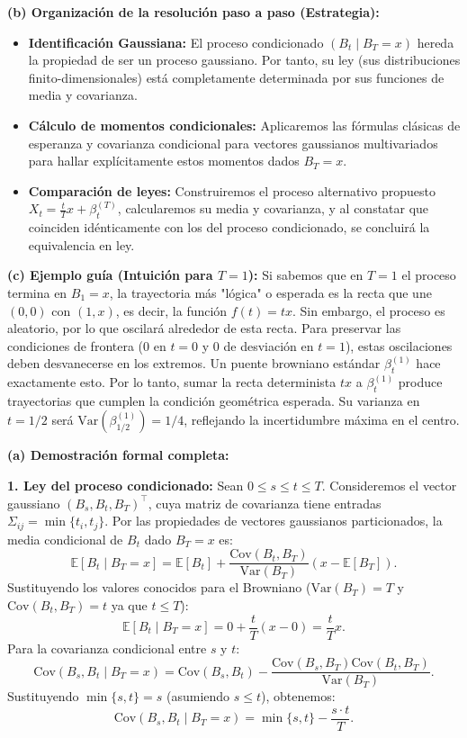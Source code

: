 \documentclass[11pt, letterpaper]{article}
\begin{document}
\begin{solucion}
    \textbf{(b) Organización de la resolución paso a paso (Estrategia):}
    \begin{itemize}
        \item[(i)] \textbf{Identificación Gaussiana:} El proceso condicionado $(B_t \mid B_T = x)$ hereda la propiedad de ser un proceso gaussiano. Por tanto, su ley (sus distribuciones finito-dimensionales) está completamente determinada por sus funciones de media y covarianza.
        \item[(ii)] \textbf{Cálculo de momentos condicionales:} Aplicaremos las fórmulas clásicas de esperanza y covarianza condicional para vectores gaussianos multivariados para hallar explícitamente estos momentos dados $B_T = x$.
        \item[(iii)] \textbf{Comparación de leyes:} Construiremos el proceso alternativo propuesto $X_t = \frac{t}{T}x + \beta_t^{(T)}$, calcularemos su media y covarianza, y al constatar que coinciden idénticamente con los del proceso condicionado, se concluirá la equivalencia en ley.
    \end{itemize}

    \vspace{3mm}
    \textbf{(c) Ejemplo guía (Intuición para $T=1$):}
    Si sabemos que en $T=1$ el proceso termina en $B_1 = x$, la trayectoria más "lógica" o esperada es la recta que une $(0,0)$ con $(1,x)$, es decir, la función $f(t) = tx$. 
    Sin embargo, el proceso es aleatorio, por lo que oscilará alrededor de esta recta. Para preservar las condiciones de frontera ($0$ en $t=0$ y $0$ de desviación en $t=1$), estas oscilaciones deben desvanecerse en los extremos. Un puente browniano estándar $\beta_t^{(1)}$ hace exactamente esto. Por lo tanto, sumar la recta determinista $tx$ a $\beta_t^{(1)}$ produce trayectorias que cumplen la condición geométrica esperada. Su varianza en $t=1/2$ será $\text{Var}(\beta_{1/2}^{(1)}) = 1/4$, reflejando la incertidumbre máxima en el centro.

    \vspace{3mm}
    \textbf{(a) Demostración formal completa:}
    
    \textbf{1. Ley del proceso condicionado:}
    Sean $0 \le s \le t \le T$. Consideremos el vector gaussiano $(B_s, B_t, B_T)^\top$, cuya matriz de covarianza tiene entradas $\Sigma_{ij} = \min\{t_i, t_j\}$.
    Por las propiedades de vectores gaussianos particionados, la media condicional de $B_t$ dado $B_T = x$ es:
    \[ \mathbb{E}[B_t \mid B_T = x] = \mathbb{E}[B_t] + \frac{\text{Cov}(B_t, B_T)}{\text{Var}(B_T)}(x - \mathbb{E}[B_T]). \]
    Sustituyendo los valores conocidos para el Browniano ($\text{Var}(B_T) = T$ y $\text{Cov}(B_t, B_T) = t$ ya que $t \le T$):
    \[ \mathbb{E}[B_t \mid B_T = x] = 0 + \frac{t}{T}(x - 0) = \frac{t}{T}x. \]
    Para la covarianza condicional entre $s$ y $t$:
    \[ \text{Cov}(B_s, B_t \mid B_T = x) = \text{Cov}(B_s, B_t) - \frac{\text{Cov}(B_s, B_T)\text{Cov}(B_t, B_T)}{\text{Var}(B_T)}. \]
    Sustituyendo $\min\{s, t\} = s$ (asumiendo $s \le t$), obtenemos:
    \[ \text{Cov}(B_s, B_t \mid B_T = x) = \min\{s, t\} - \frac{s \cdot t}{T}. \]
    

\end{solucion}
\end{document}
